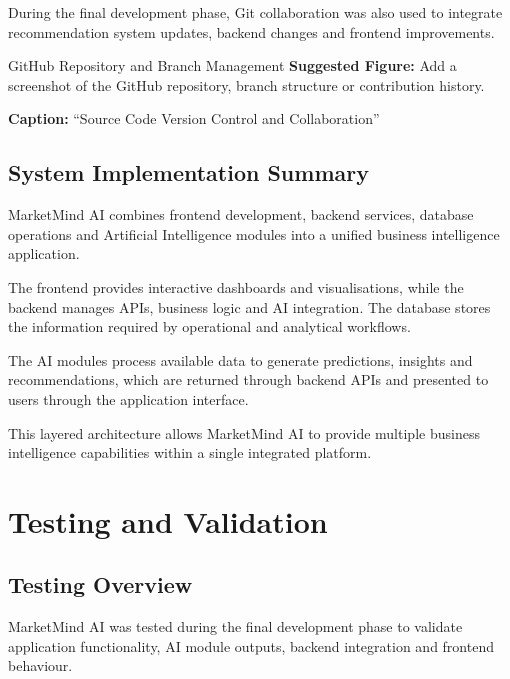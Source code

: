 \documentclass[12pt,a4paper]{report}
\begin{document}
During the final development phase, Git collaboration was also used to
integrate recommendation system updates, backend changes and frontend
improvements.

\begin{screenshotplaceholder}{GitHub Repository and Branch Management}
\textbf{Suggested Figure:} Add a screenshot of the GitHub repository,
branch structure or contribution history.

\textbf{Caption:} ``Source Code Version Control and Collaboration''
\end{screenshotplaceholder}



\section{System Implementation Summary}

MarketMind AI combines frontend development, backend services, database
operations and Artificial Intelligence modules into a unified business
intelligence application.

The frontend provides interactive dashboards and visualisations, while
the backend manages APIs, business logic and AI integration. The
database stores the information required by operational and analytical
workflows.

The AI modules process available data to generate predictions,
insights and recommendations, which are returned through backend APIs
and presented to users through the application interface.

This layered architecture allows MarketMind AI to provide multiple
business intelligence capabilities within a single integrated platform.

\newpage

\chapter{Testing and Validation}

\section{Testing Overview}

MarketMind AI was tested during the final development phase to validate
application functionality, AI module outputs, backend integration and
frontend behaviour.
\end{document}
